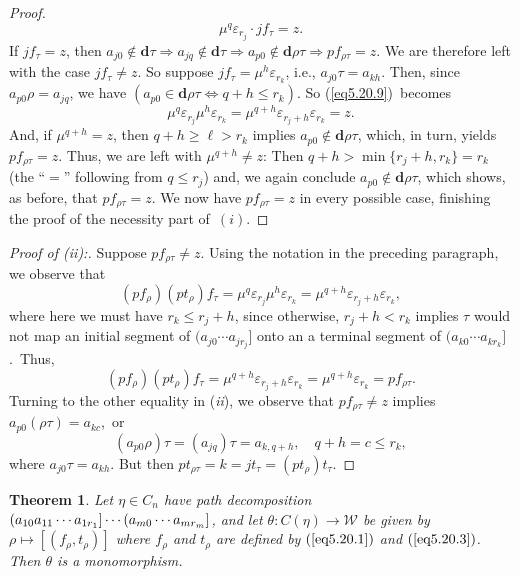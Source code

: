 \documentclass{surv-l}
\numberwithin{equation}{section}
\numberwithin{table}{section}
\numberwithin{figure}{section}
\newtheorem{theorem}[equation]{Theorem}
\theoremstyle{definition}
\begin{document}
\begin{proof}
\[
\mu^{q}\varepsilon_{r_{j}}\cdot jf_{\tau}=z.
\]
If $jf_{\tau}=z$, then $a_{j0}\not\in \mathbf{d}\tau\Rightarrow
a_{jq}\not\in \mathbf{d}\tau\Rightarrow a_{p0}\not\in
\mathbf{d}\rho\tau\Rightarrow pf_{\rho\tau}=z$. We are therefore
left with the case $jf_{\tau}\neq z$. So suppose
$jf_{\tau}=\mu^{h}\varepsilon_{r_{k}}$, i.e., $a_{j0}\tau=a_{kh}$.
Then, since $a_{p0}\rho=a_{jq}$, we have $(a_{p0}\in
\mathbf{d}\rho\tau\Leftrightarrow q+h\leq r_{k})$. So
(\ref{eq5.20.9})~becomes
\[
\mu^{q}\varepsilon_{r_{j}}\mu^{h}\varepsilon_{r_{k}}=\mu^{q+h}
\varepsilon_{r_{j}+h}\varepsilon_{r_{k}}=z.
\]
And, if $\mu^{q+h}=z$, then $q+h\geq\ell>r_{k}$ implies
$a_{p0}\not\in \mathbf{d}\rho\tau$, which, in turn, yields
$pf_{\rho\tau}=z$. Thus, we are left with $\mu^{q+h}\neq z$: Then
$q+h> \min\{r_{j}+h, r_{k}\}=r_{k}$ (the ``$=$'' following from $q\leq
r_{j}$) and, we again conclude $a_{p0}\not\in \mathbf{d}\rho\tau$,
which shows, as before, that $pf_{\rho\tau}=z$. We now have
$pf_{\rho\tau}=z$ in every possible case, finishing the proof of
the necessity part of~$(i)$.
\end{proof}

\begin{proof}[Proof of (\emph{ii}):] Suppose $pf_{\rho\tau}\neq z$. Using the
notation in the preceding paragraph, we observe that
\[
(pf_{\rho})(pt_{\rho})f_{\tau}=\mu^{q}\varepsilon_{r_{j}}\mu^{h}\varepsilon_{r_{k}}
=\mu^{q+h}\varepsilon_{r_{j}+h}\varepsilon_{r_{k}},
\]
where here we must have $r_{k}\leq r_{j}+h$, since otherwise,
$r_{j}+h<r_{k}$ implies $\tau$ would not map an initial segment of
$(a_{j0}\cdots a_{jr_{j}}]$ onto an a terminal segment of
$(a_{k0}\cdots a_{kr_{k}}]$.~Thus,
\[
(pf_{\rho})(pt_{\rho})f_{\tau}=\mu^{q+h} \varepsilon_{r_{j}+h}\varepsilon_{r_{k}}
=\mu^{q+h}\varepsilon_{r_{k}}=pf_{\rho\tau}.
\]
Turning to the other equality in (\emph{ii}), we observe that
$pf_{\rho\tau}\neq z$ implies $a_{p0}(\rho\tau)=a_{kc}$,~or
\[
(a_{p0}\rho)\tau=(a_{jq})\tau=a_{k,q+h},\quad q+h=c\leq r_{k},
\]
where $a_{j0}\tau=a_{kh}$. But then
$pt_{\rho\tau}=k=jt_{\tau}=(pt_{\rho})t_{\tau}.$
\end{proof}

\begin{theorem}\label{thm5.20.10}
Let $\eta\in C_{n}$ have path decomposition $(a_{10}a_{11}\cdots
a_{{1r}_{1}}]\cdots\break (a_{m0}\cdots a_{mr_{m}}]$, and let $\theta :
C(\eta)\rightarrow \mathcal{W}$ be given by
$\rho\mapsto[(f_{\rho}, t_{\rho})]$ where $f_{\rho}$ and
$t_{\rho}$ are defined by $(\ref{eq5.20.1})$ and
$(\ref{eq5.20.3})$. Then $\theta$ is a monomorphism.
\end{theorem}
\end{document}
